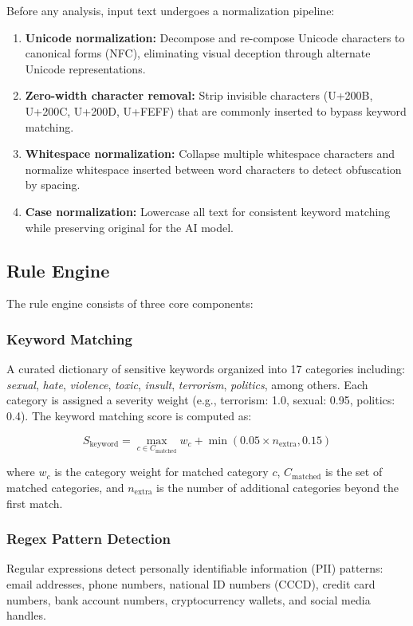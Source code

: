 \documentclass[12pt,a4paper]{article}
\begin{document}
Before any analysis, input text undergoes a normalization pipeline:
\begin{enumerate}[leftmargin=*]
    \item \textbf{Unicode normalization:} Decompose and re-compose Unicode characters to canonical forms (NFC), eliminating visual deception through alternate Unicode representations.
    \item \textbf{Zero-width character removal:} Strip invisible characters (U+200B, U+200C, U+200D, U+FEFF) that are commonly inserted to bypass keyword matching.
    \item \textbf{Whitespace normalization:} Collapse multiple whitespace characters and normalize whitespace inserted between word characters to detect obfuscation by spacing.
    \item \textbf{Case normalization:} Lowercase all text for consistent keyword matching while preserving original for the AI model.
\end{enumerate}

\subsection{Rule Engine}

The rule engine consists of three core components:

\subsubsection{Keyword Matching}
A curated dictionary of sensitive keywords organized into 17 categories including: \textit{sexual}, \textit{hate}, \textit{violence}, \textit{toxic}, \textit{insult}, \textit{terrorism}, \textit{politics}, among others.
Each category is assigned a severity weight (e.g., terrorism: 1.0, sexual: 0.95, politics: 0.4).
The keyword matching score is computed as:

\begin{equation}
    S_{\text{keyword}} = \max_{c \in C_{\text{matched}}} w_c + \min(0.05 \times n_{\text{extra}}, 0.15)
    \label{eq:keyword_score}
\end{equation}

where $w_c$ is the category weight for matched category $c$, $C_{\text{matched}}$ is the set of matched categories, and $n_{\text{extra}}$ is the number of additional categories beyond the first match.

\subsubsection{Regex Pattern Detection}
Regular expressions detect personally identifiable information (PII) patterns: email addresses, phone numbers, national ID numbers (CCCD), credit card numbers, bank account numbers, cryptocurrency wallets, and social media handles.
\end{document}

